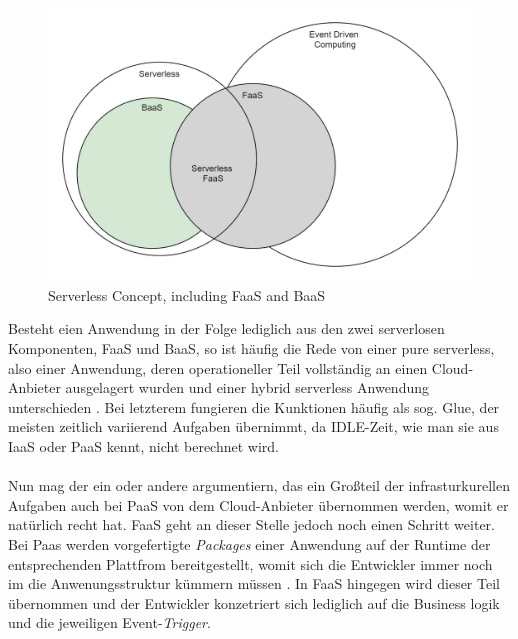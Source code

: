 \documentclass[11pt]{article}
\begin{document}
\begin{figure}[H]
\caption{Serverless Concept, including FaaS and BaaS}
\label{fig:serverlessBaaSandPaas}
\centering
\includegraphics[width=1\textwidth]{Serverless}
\end{figure} 
Besteht eien Anwendung in der Folge lediglich aus den zwei \glqq serverlosen\grqq{} Komponenten, FaaS und BaaS, so ist häufig die Rede von einer \glqq pure serverless\grqq{}, also einer Anwendung, deren operationeller Teil vollständig an einen Cloud-Anbieter ausgelagert wurden und einer \glqq hybrid serverless\grqq{} Anwendung unterschieden \cite{leitner2019mixed}. Bei letzterem fungieren die Kunktionen häufig als sog. \glqq Glue\grqq{}, der meisten zeitlich variierend Aufgaben übernimmt, da IDLE-Zeit, wie man sie aus IaaS oder PaaS kennt, nicht berechnet wird.\\\\Nun mag der ein oder andere argumentiern, das ein Großteil der infrasturkurellen Aufgaben auch bei PaaS von dem Cloud-Anbieter übernommen werden, womit er natürlich recht hat. FaaS geht an dieser Stelle jedoch noch einen Schritt weiter. Bei Paas werden vorgefertigte \textit{Packages} einer Anwendung auf der Runtime der entsprechenden Plattfrom bereitgestellt, womit sich die Entwickler immer noch im die Anwenungsstruktur kümmern müssen \cite{kaplan2019framework}. In FaaS hingegen wird dieser Teil übernommen und der Entwickler konzetriert sich lediglich auf die Business logik und die jeweiligen Event-\textit{Trigger}. \\\\
\end{document}

